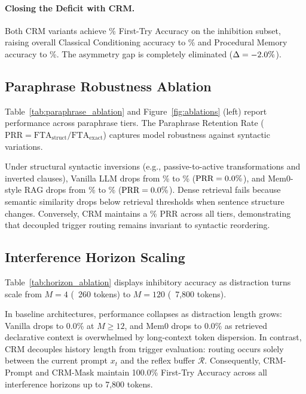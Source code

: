 \documentclass[11pt,journal,onecolumn]{IEEEtran}
\begin{document}
\paragraph{Closing the Deficit with CRM.}
Both CRM variants achieve \ValcrmpromptInhibition\% First-Try Accuracy on the inhibition subset, raising overall Classical Conditioning accuracy to \ValcrmpromptClassical\% and Procedural Memory accuracy to \ValcrmpromptProcedural\%. The asymmetry gap is completely eliminated ($\Delta = -2.0\%$).

\subsection{Paraphrase Robustness Ablation}

Table~\ref{tab:paraphrase_ablation} and Figure~\ref{fig:ablations} (left) report performance across paraphrase tiers. The Paraphrase Retention Rate ($\text{PRR} = \text{FTA}_{\text{struct}} / \text{FTA}_{\text{exact}}$) captures model robustness against syntactic variations.

Under structural syntactic inversions (e.g., passive-to-active transformations and inverted clauses), Vanilla LLM drops from \ValParavanillaExact\% to \ValParavanillaStructural\% ($\text{PRR} = 0.0\%$), and Mem0-style RAG drops from \ValParamemZeroragExact\% to \ValParamemZeroragStructural\% ($\text{PRR} = 0.0\%$). Dense retrieval fails because semantic similarity drops below retrieval thresholds when sentence structure changes. Conversely, CRM maintains a \ValParacrmpromptPRR\% PRR across all tiers, demonstrating that decoupled trigger routing remains invariant to syntactic reordering.



\subsection{Interference Horizon Scaling}

Table~\ref{tab:horizon_ablation} displays inhibitory accuracy as distraction turns scale from $M=4$ (~260 tokens) to $M=120$ (~7,800 tokens).

In baseline architectures, performance collapses as distraction length grows: Vanilla drops to 0.0\% at $M \ge 12$, and Mem0 drops to 0.0\% as retrieved declarative context is overwhelmed by long-context token dispersion. In contrast, CRM decouples history length from trigger evaluation: routing occurs solely between the current prompt $x_t$ and the reflex buffer $\mathcal{R}$. Consequently, CRM-Prompt and CRM-Mask maintain 100.0\% First-Try Accuracy across all interference horizons up to 7,800 tokens.
\end{document}
